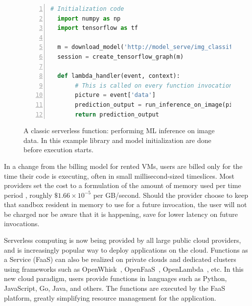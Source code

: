 \begin{figure}
  \begin{lstlisting}[language=Python, numbers=left, frame=single, basicstyle=\footnotesize\sffamily, columns=fullflexible]
  # Initialization code 
  import numpy as np 
  import tensorflow as tf
    
  m = download_model('http://model_serve/img_classify.pb')
  session = create_tensorflow_graph(m) 
    
  def lambda_handler(event, context):
       # This is called on every function invocation 
       picture = event['data']
       prediction_output = run_inference_on_image(picture) 
       return prediction_output 
     \end{lstlisting}
     \caption{A classic serverless function: performing ML inference on image data. 
              In this example library and model initialization are done before execution starts.}
     \label{fig:lambda-example}
\end{figure}

In a change from the billing model for rented VMs, users are billed only for the time their code is executing, often in small millisecond-sized timeslices.
Most providers set the cost to a formulation of the amount of memory used per time period \cite{lambda-pricing}, roughly $\$1.66 \times 10^{-5}$ per GB/second.
Should the provider choose to keep that sandbox resident in memory to use for a future invocation, the user will not be charged nor be aware that it is happening, save for lower latency on future invocations.



Serverless computing is now being provided by all large public cloud providers, and 
is increasingly popular way to deploy applications on the cloud.  
Functions as a Service (FaaS) can also be realized on private clouds and dedicated clusters using frameworks such as OpenWhisk~\cite{openwhisk}, OpenFaaS~\cite{openfaas},  OpenLambda~\cite{hendrickson2016serverless}, etc. 
In this new cloud paradigm, users provide functions in languages such as Python, JavaScript, Go, Java, and others. 
The functions are executed by the FaaS platform, greatly simplifying resource management for the application. 



